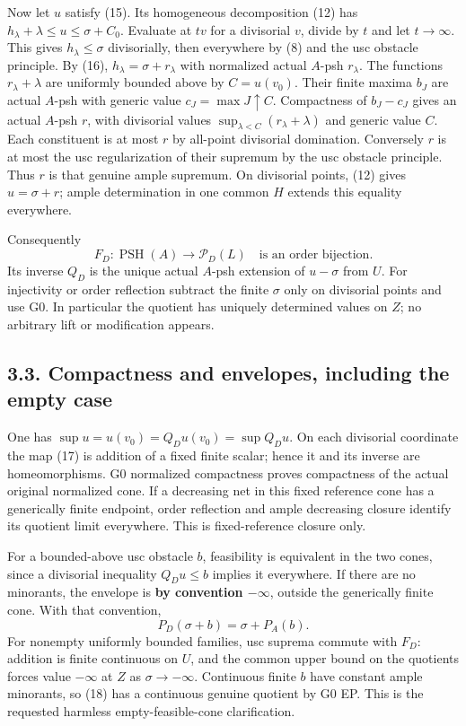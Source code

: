 \documentclass[
  10pt,
]{article}
\begin{document}
Now let \(u\) satisfy (15). Its homogeneous decomposition (12) has
\(h_\lambda+\lambda\leq u\leq\sigma+C_0\). Evaluate at \(tv\) for a
divisorial \(v\), divide by \(t\) and let \(t\to\infty\). This gives
\(h_\lambda\leq\sigma\) divisorially, then everywhere by (8) and the usc
obstacle principle. By (16), \(h_\lambda=\sigma+r_\lambda\) with
normalized actual \(A\)-psh \(r_\lambda\). The functions
\(r_\lambda+\lambda\) are uniformly bounded above by \(C=u(v_0)\). Their
finite maxima \(b_J\) are actual \(A\)-psh with generic value
\(c_J=\max J\uparrow C\). Compactness of \(b_J-c_J\) gives an actual
\(A\)-psh \(r\), with divisorial values
\(\sup_{\lambda<C}(r_\lambda+\lambda)\) and generic value \(C\). Each
constituent is at most \(r\) by all-point divisorial domination.
Conversely \(r\) is at most the usc regularization of their supremum by
the usc obstacle principle. Thus \(r\) is that genuine ample supremum.
On divisorial points, (12) gives \(u=\sigma+r\); ample determination in
one common \(H\) extends this equality everywhere.

Consequently \[F_D:\operatorname{PSH}(A)\longrightarrow\mathcal P_D(L)
\quad\text{is an order bijection}.\tag{17}\] Its inverse \(Q_D\) is the
unique actual \(A\)-psh extension of \(u-\sigma\) from \(U\). For
injectivity or order reflection subtract the finite \(\sigma\) only on
divisorial points and use G0. In particular the quotient has uniquely
determined values on \(Z\); no arbitrary lift or modification appears.

\subsection{3.3. Compactness and envelopes, including the empty
case}\label{compactness-and-envelopes-including-the-empty-case}

One has \(\sup u=u(v_0)=Q_Du(v_0)=\sup Q_Du\). On each divisorial
coordinate the map (17) is addition of a fixed finite scalar; hence it
and its inverse are homeomorphisms. G0 normalized compactness proves
compactness of the actual original normalized cone. If a decreasing net
in this fixed reference cone has a generically finite endpoint, order
reflection and ample decreasing closure identify its quotient limit
everywhere. This is fixed-reference closure only.

For a bounded-above usc obstacle \(b\), feasibility is equivalent in the
two cones, since a divisorial inequality \(Q_Du\leq b\) implies it
everywhere. If there are no minorants, the envelope is \textbf{by
convention \(-\infty\)}, outside the generically finite cone. With that
convention, \[P_D(\sigma+b)=\sigma+P_A(b).\tag{18}\] For nonempty
uniformly bounded families, usc suprema commute with \(F_D\): addition
is finite continuous on \(U\), and the common upper bound on the
quotients forces value \(-\infty\) at \(Z\) as \(\sigma\to-\infty\).
Continuous finite \(b\) have constant ample minorants, so (18) has a
continuous genuine quotient by G0 EP. This is the requested harmless
empty-feasible-cone clarification.
\end{document}
